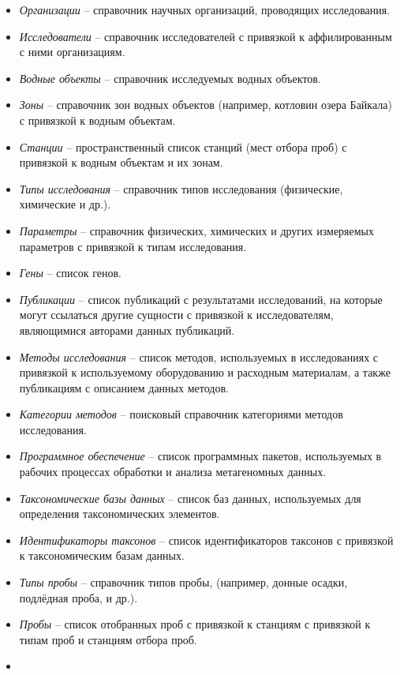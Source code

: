 \documentclass[a4paper,12pt,openany,final]{extreport}
\begin{document}
\begin{itemize}
\item
  \emph{Организации} -- справочник научных организаций, проводящих
  исследования.
\item
  \emph{Исследователи} -- справочник исследователей с привязкой к
  аффилированным с ними организациям.
\item
  \emph{Водные объекты} -- справочник исследуемых водных объектов.
\item
  \emph{Зоны} -- справочник зон водных объектов (например, котловин
  озера Байкала) с привязкой к водным объектам.
\item
  \emph{Станции} -- пространственный список станций (мест отбора проб) с
  привязкой к водным объектам и их зонам.
\item
  \emph{Типы исследования} -- справочник типов исследования (физические,
  химические и др.).
\item
  \emph{Параметры} -- справочник физических, химических и других
  измеряемых параметров с привязкой к типам исследования.
\item
  \emph{Гены} -- список генов.
\item
  \emph{Публикации} -- список публикаций с результатами исследований, на
  которые могут ссылаться другие сущности с привязкой к исследователям,
  являющимися авторами данных публикаций.
\item
  \emph{Методы исследования} -- список методов, используемых в
  исследованиях с привязкой к используемому оборудованию и расходным
  материалам, а также публикациям с описанием данных методов.
\item
  \emph{Категории методов} -- поисковый справочник категориями методов
  исследования.
\item
  \emph{Программное обеспечение} -- список программных пакетов,
  используемых в рабочих процессах обработки и анализа метагеномных
  данных.
\item
  \emph{Таксономические базы данных} -- список баз данных, используемых
  для определения таксономических элементов.
\item
  \emph{Идентификаторы таксонов} -- список идентификаторов таксонов с
  привязкой к таксономическим базам данных.
\item
  \emph{Типы пробы} -- справочник типов пробы, (например, донные осадки,
  подлёдная проба, и др.).
\item
  \emph{Пробы} -- список отобранных проб с привязкой к станциям с
  привязкой к типам проб и станциям отбора проб.
\item

\end{itemize}
\end{document}
